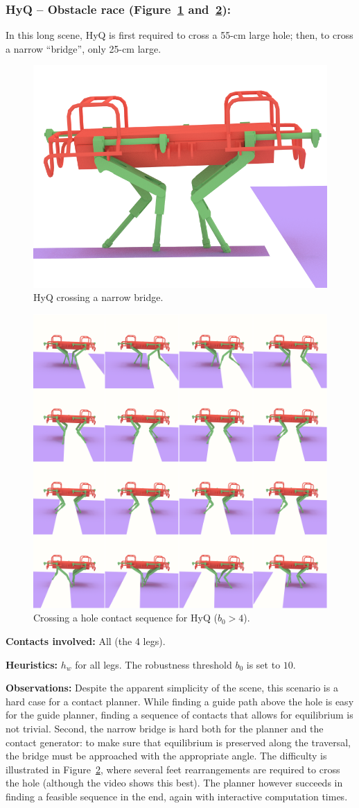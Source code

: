 \subsubsection{HyQ -- Obstacle race (Figure~\ref{fig:HyQ_bridge} and~\ref{fig:HyQ_obs}):}
In this long scene, HyQ is first required to cross a 55-cm large hole; then, to cross a narrow ``bridge'', only 25-cm large.

\begin{figure}
  \centering
  \includegraphics[width=0.4\linewidth]{figures/HyQ_bridge}
  \caption{
           HyQ crossing a narrow bridge. }
		   \label{fig:HyQ_bridge}
\end{figure}

\begin{figure}
  \centering
  \includegraphics[width=0.5\linewidth]{figures/HyQ_obs}
  \caption{
           Crossing a hole contact sequence for HyQ ($b_0 > 4$). }
		   \label{fig:HyQ_obs}
\end{figure}



\noindent\textbf{Contacts involved:} All (the 4 legs).

\noindent\textbf{Heuristics:} $h_w$ for all legs. The robustness threshold $b_0$ is set to $10$.

\noindent\textbf{Observations:} Despite the apparent simplicity of the scene, this scenario is a hard case for a contact planner.
While finding a guide path above the hole is easy for the guide planner, finding a sequence of contacts that allows for equilibrium is not trivial.
Second, the narrow bridge is hard both for the planner and the contact generator: to make sure that equilibrium is preserved along the traversal,
the bridge must be approached with the appropriate angle.
The difficulty is illustrated in Figure~\ref{fig:HyQ_obs}, where several feet rearrangements are required to cross the hole (although the video shows this best).
The planner however succeeds in finding a feasible sequence in the end, again with \gls{interactive} computation times.

